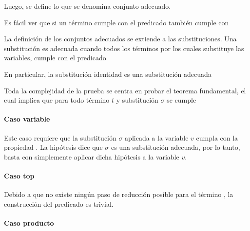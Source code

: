 
Luego, se define lo que se denomina conjunto adecuado.


Es fácil ver que si un término cumple con el predicado  también cumple con 


La definición de los conjuntos adecuados se extiende a las substituciones.
Una substitución es adecuada cuando todos los términos por los cuales substituye las variables, cumple con el predicado 


En particular, la substitución identidad  es una substitución adecuada

Toda la complejidad de la prueba se centra en probar el teorema fundamental, el cual implica que para todo término $t$ y substitución $\sigma$ se cumple
\snstar{}


\paragraph{Caso variable}

Este caso requiere que la substitución $\sigma$ aplicada a la variable $v$ cumpla con la propiedad
\snstar.
La hipótesis dice que $\sigma$ es una substitución adecuada, por lo tanto, basta con simplemente aplicar dicha hipótesis a la variable $v$.


\paragraph{Caso top}

Debido a que no existe ningún paso de reducción posible para el término \const{$\star$}, la construcción del predicado es trivial.


\paragraph{Caso producto}

